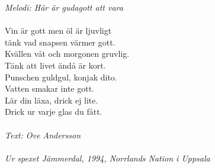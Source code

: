 {\footnotesize\textit{Melodi: Här är gudagott att vara}}\\
\\
Vin är gott men öl är ljuvligt\\
tänk vad snapsen värmer gott.\\
Kvällen våt och morgonen gruvlig.\\
Tänk att livet ändå är kort.\\
Punschen guldgul, konjak dito.\\
Vatten smakar inte gott.\\
Lär din läxa, drick ej lite.\\
Drick ur varje glas du fått.\\
\\
{\footnotesize\textit{Text: Ove Andersson\\ \\ Ur spexet Jämmerdal,
    1994, Norrlands Nation i Uppsala}}
